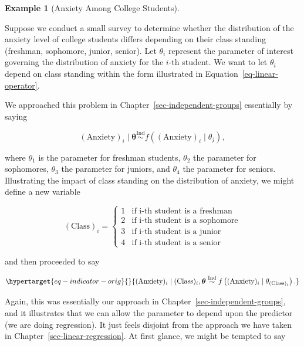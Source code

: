\documentclass[
  letterpaper,
  DIV=11,
  numbers=noendperiod]{scrreprt}
\theoremstyle{definition}
\newtheorem{example}{Example}[chapter]
\theoremstyle{definition}
\theoremstyle{plain}
\theoremstyle{remark}
\begin{document}
\begin{example}[Anxiety Among College
Students]\protect\hypertarget{exm-anxiety}{}\label{exm-anxiety}

Suppose we conduct a small survey to determine whether the distribution
of the anxiety level of college students differs depending on their
class standing (freshman, sophomore, junior, senior). Let \(\theta_i\)
represent the parameter of interest governing the distribution of
anxiety for the \(i\)-th student. We want to let \(\theta_i\) depend on
class standing within the form illustrated in
Equation~\ref{eq-linear-operator}.

\end{example}

We approached this problem in Chapter~\ref{sec-independent-groups}
essentially by saying

\[(\text{Anxiety})_i \mid \boldsymbol{\theta} \stackrel{\text{Ind}}{\sim}f\left((\text{Anxiety})_i \mid \theta_j\right),\]

where \(\theta_1\) is the parameter for freshman students, \(\theta_2\)
the parameter for sophomores, \(\theta_3\) the parameter for juniors,
and \(\theta_4\) the parameter for seniors. Illustrating the impact of
class standing on the distribution of anxiety, we might define a new
variable

\[(\text{Class})_i = \begin{cases}
1 & \text{if i-th student is a freshman} \\
2 & \text{if i-th student is a sophomore} \\
3 & \text{if i-th student is a junior} \\
4 & \text{if i-th student is a senior} \end{cases}\]

and then proceeded to say

\begin{equation}\protect\hypertarget{eq-indicator-orig}{}{(\text{Anxiety})_i \mid (\text{Class})_i, \boldsymbol{\theta} \stackrel{\text{Ind}}{\sim}f\left((\text{Anxiety})_i \mid \theta_{(\text{Class})_i}\right).}\label{eq-indicator-orig}\end{equation}

Again, this was essentially our approach in
Chapter~\ref{sec-independent-groups}, and it illustrates that we can
allow the parameter to depend upon the predictor (we are doing
regression). It just feels disjoint from the approach we have taken in
Chapter~\ref{sec-linear-regression}. At first glance, we might be
tempted to say
\end{document}
